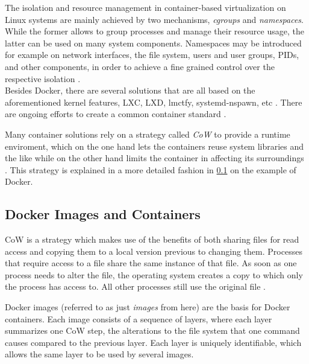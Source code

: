       The isolation and resource management in container-based virtualization on Linux systems are mainly achieved by two mechanisms, \emph{\ac{cgroups}} and \emph{namespaces}. While the former allows to group processes and manage their resource usage, the latter can be used on many system components. Namespaces may be introduced for example on network interfaces, the file system, users and user groups, \ac{PID}s, and other components, in order to achieve a fine grained control over the respective isolation \cite{Ruiz2015Performance}. \\
      Besides Docker, there are several solutions that are all based on the aforementioned kernel features, \eg LXC, LXD, lmctfy, systemd-nspawn, etc \cite{Ruiz2015Performance}. There are ongoing efforts to create a common container standard \cite{Initiative????Open}.

      Many container solutions rely on a strategy called \emph{\ac{CoW}} to provide a runtime enviroment, which on the one hand lets the containers reuse system libraries and the like while on the other hand limits the container in affecting its surroundings \cite{Docker????Dockera,Pahl2015Containerization}. This strategy is explained in a more detailed fashion in \ref{sub:docker_images_and_containers} on the example of Docker.


  \subsection{Docker Images and Containers} %
  \label{sub:docker_images_and_containers}
    \ac{CoW} is a strategy which makes use of the benefits of both sharing files for read access and copying them to a local version previous to changing them. Processes that require access to a file share the same instance of that file. As soon as one process needs to alter the file, the operating system creates a copy to which only the process has access to. All other processes still use the original file \cite{Pahl2015Containerization,Docker????Dockera}.

    Docker images (referred to as just \emph{images} from here) are the basis for Docker containers. Each image consists of a sequence of layers, where each layer summarizes one \ac{CoW} step, \ie the alterations to the file system that one command causes compared to the previous layer. Each layer is uniquely identifiable, which allows the same layer to be used by several images.

